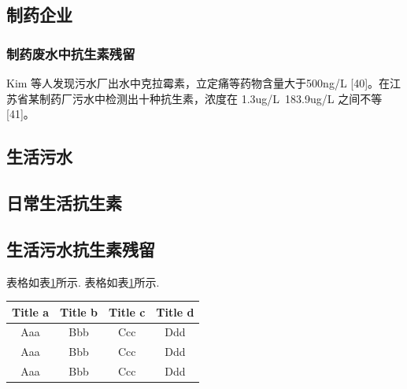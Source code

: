 \documentclass{SCIS2020cn}
\begin{document}
\subsection{制药企业}
\subsubsection{制药废水中抗生素残留}
Kim 等人发现污水厂出水中克拉霉素，立定痛等药物含量大于500ng/L [40]。在江苏省某制药厂污水中检测出十种抗生素，浓度在 1.3ug/L~183.9ug/L 之间不等 [41]。
\subsubsection{}



\subsection{生活污水}
\subsection{日常生活抗生素}
\subsection{生活污水抗生素残留}













表格如表\ref{tab1}所示.
表格如表\ref{tab1}所示.
\begin{table}[!t]
\label{tab1}
\footnotesize
\tabcolsep 49pt %
\begin{tabular*}{\textwidth}{cccc}
\toprule
  Title a & Title b & Title c & Title d \\\hline
  Aaa & Bbb & Ccc & Ddd\\
  Aaa & Bbb & Ccc & Ddd\\
  Aaa & Bbb & Ccc & Ddd\\
\bottomrule
\end{tabular*}
\end{table}
\end{document}
